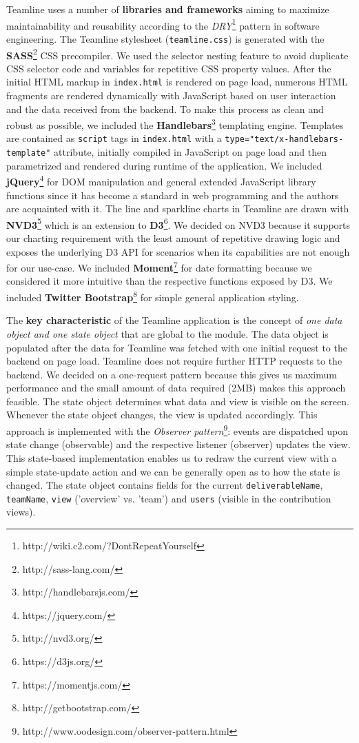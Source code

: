 \documentclass[../manifest.tex]{subfiles}
\begin{document}
Teamline uses a number of \textbf{libraries and frameworks} aiming to maximize maintainability and reusability according to the \textit{DRY}\footnote{http://wiki.c2.com/?DontRepeatYourself} pattern in software engineering. The Teamline stylesheet (\texttt{teamline.css}) is generated with the \textbf{SASS}\footnote{http://sass-lang.com/} CSS precompiler. We used the selector nesting feature to avoid duplicate CSS selector code and variables for repetitive CSS property values. After the initial HTML markup in \texttt{index.html} is rendered on page load, numerous HTML fragments are rendered dynamically with JavaScript based on user interaction and the data received from the backend. To make this process as clean and robust as possible, we included the \textbf{Handlebars}\footnote{http://handlebarsjs.com/} templating engine. Templates are contained as \texttt{script} tags in \texttt{index.html} with a \texttt{type="text/x-handlebars-template"} attribute, initially compiled in JavaScript on page load and then parametrized and rendered during runtime of the application. We included \textbf{jQuery}\footnote{https://jquery.com/} for DOM manipulation and general extended JavaScript library functions since it has become a standard in web programming and the authors are acquainted with it. The line and sparkline charts in Teamline are drawn with \textbf{NVD3}\footnote{http://nvd3.org/} which is an extension to \textbf{D3}\footnote{https://d3js.org/}. We decided on NVD3 because it supports our charting requirement with the least amount of repetitive drawing logic and exposes the underlying D3 API for scenarios when its capabilities are not enough for our use-case. We included \textbf{Moment}\footnote{https://momentjs.com/} for date formatting because we considered it more intuitive than the respective functions exposed by D3. We included \textbf{Twitter Bootstrap}\footnote{http://getbootstrap.com/} for simple general application styling.

The \textbf{key characteristic} of the Teamline application is the concept of \textit{one data object and one state object} that are global to the module. The data object is populated after the data for Teamline was fetched with one initial request to the backend on page load. Teamline does not require further HTTP requests to the backend. We decided on a one-request pattern because this gives us maximum performance and the small amount of data required (\texttildelow2MB) makes this approach feasible. The state object determines what data and view is visible on the screen. Whenever the state object changes, the view is updated accordingly. This approach is implemented with the \textit{Observer pattern}\footnote{http://www.oodesign.com/observer-pattern.html}: events are dispatched upon state change (observable) and the respective listener (observer) updates the view. This state-based implementation enables us to redraw the current view with a simple state-update action and we can be generally open as to how the state is changed. The state object contains fields for the current \texttt{deliverableName}, \texttt{teamName}, \texttt{view} ('overview' vs. 'team') and \texttt{users} (visible in the contribution views).
\end{document}
